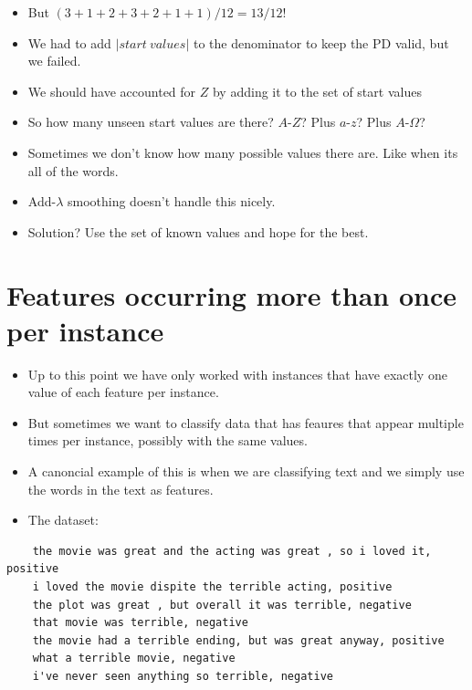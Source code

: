 \documentclass[11pt,letterpaper]{article}
\begin{document}
\begin{itemize}
\begin{itemize}
      \item But $(3+1+2+3+2+1+1)/12 = 13/12$!
      \item We had to add $|start~values|$ to the denominator to keep the PD valid, but we failed.
      \item We should have accounted for $Z$ by adding it to the set of start values
      \item So how many unseen start values are there?  $A$-$Z$?  Plus $a$-$z$?  Plus $A$-$\Omega$?
      \item Sometimes we don't know how many possible values there are.  Like when its all of the words.
      \item Add-$\lambda$ smoothing doesn't handle this nicely.
      \item Solution? Use the set of known values and hope for the best.
    \end{itemize}


\end{itemize}




\section{Features occurring more than once per instance}

\begin{itemize}
  \item Up to this point we have only worked with instances that have exactly one value of each feature per instance.
  \item But sometimes we want to classify data that has feaures that appear multiple times per instance, possibly with the same values.
  \item A canoncial example of this is when we are classifying text and we simply use the words in the text as features.

  \item The dataset:
\end{itemize}
    \begin{verbatim}
    the movie was great and the acting was great , so i loved it, positive
    i loved the movie dispite the terrible acting, positive
    the plot was great , but overall it was terrible, negative
    that movie was terrible, negative
    the movie had a terrible ending, but was great anyway, positive
    what a terrible movie, negative
    i've never seen anything so terrible, negative\end{verbatim}
\end{document}
